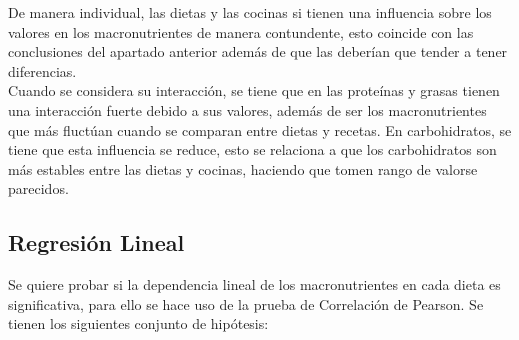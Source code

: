 \documentclass[12pt,a4paper]{article}
\begin{document}
{{            De manera individual, las dietas y las cocinas si tienen una influencia 
            sobre los valores en los macronutrientes de manera contundente, esto 
            coincide con las conclusiones del apartado anterior además de que las 
            deberían que tender a tener diferencias.\\
            
            Cuando se considera su interacción, 
            se tiene que en las proteínas y grasas tienen una interacción fuerte debido 
            a sus valores, además de ser los macronutrientes que más fluctúan cuando 
            se comparan entre dietas y recetas. En carbohidratos, se tiene que esta 
            influencia se reduce, esto se relaciona a que los carbohidratos son más 
            estables entre las dietas y cocinas, haciendo que tomen rango de valorse 
            parecidos.
        }

        \subsection{Regresión Lineal}
        {
            Se quiere probar si la dependencia lineal de los macronutrientes en cada 
            dieta es significativa, para ello se hace uso de la prueba de Correlación 
            de Pearson. Se tienen los siguientes conjunto de hipótesis:\\
            
}}
\end{document}
